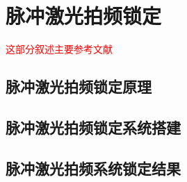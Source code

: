 
\chapter[脉冲激光拍频锁定]{脉冲激光拍频锁定}

\textcolor{red}{这部分叙述主要参考文献\cite[]{Islam_Campbell_Choi_Clark_Conover_Debnath_Edwards_Fields_Hayes_Hucul_et_al_2014}}

\section[脉冲激光拍频锁定原理]{脉冲激光拍频锁定原理}

\section[脉冲激光拍频锁定系统搭建]{脉冲激光拍频锁定系统搭建}

\section[脉冲激光拍频系统锁定结果]{脉冲激光拍频系统锁定结果}

